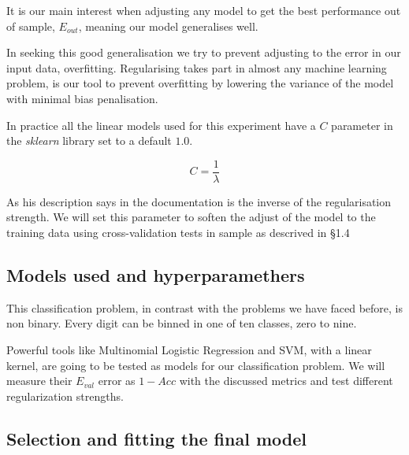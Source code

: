 \documentclass{article}
\begin{document}
It is our main interest when adjusting any model to get the best performance out of sample, $E_{out}$, meaning our model generalises well. 

In seeking this good generalisation we try to prevent adjusting to the error in our input data, overfitting.
Regularising takes part in almost any machine learning problem, is our tool to prevent overfitting by lowering the variance of the model with minimal bias penalisation.

In practice all the linear models used for this experiment have a $C$ parameter in the \textit{sklearn} library set to a default $1.0$.

\[C=\frac{1}{\lambda}\]

As his description says in the documentation is the inverse of the regularisation strength. We will set this parameter to soften the adjust of the model to the training data using cross-validation tests in sample as descrived in \S 1.4


\subsection{Models used and hyperparamethers}
This classification problem, in contrast with the problems we have faced before, is non binary. Every digit can be binned in one of ten classes, zero to nine.


\indent Powerful tools like Multinomial Logistic Regression and SVM, with a linear kernel, are going to be tested as models for our classification problem. We will measure their $E_{val}$ error as $1-Acc$ with the discussed metrics and test different regularization strengths.


\subsection{Selection and fitting the final model}
\end{document}
